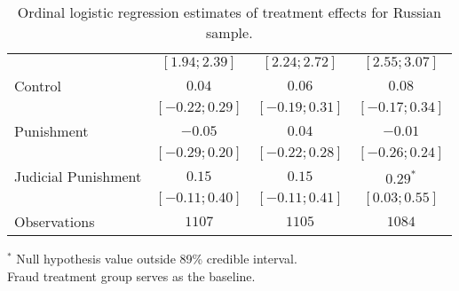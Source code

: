 \begin{table}[h]
\begin{center}
\begin{threeparttable}
\begin{tabular}{l c c c}
                    & $ [ 1.94;  2.39]$ & $ [ 2.24;  2.72]$ & $ [ 2.55;  3.07]$ \\
Control             & $0.04$            & $0.06$            & $0.08$            \\
                    & $ [-0.22;  0.29]$ & $ [-0.19;  0.31]$ & $ [-0.17;  0.34]$ \\
Punishment          & $-0.05$           & $0.04$            & $-0.01$           \\
                    & $ [-0.29;  0.20]$ & $ [-0.22;  0.28]$ & $ [-0.26;  0.24]$ \\
Judicial Punishment & $0.15$            & $0.15$            & $0.29^{*}$        \\
                    & $ [-0.11;  0.40]$ & $ [-0.11;  0.41]$ & $ [ 0.03;  0.55]$ \\
\hline
Observations        & $1107$            & $1105$            & $1084$            \\
\hline
\end{tabular}
\begin{tablenotes}[flushleft]
\scriptsize{$^*$ Null hypothesis value outside 89\% credible interval.  \\
Fraud treatment group serves as the baseline.}
\end{tablenotes}
\end{threeparttable}
\caption{Ordinal logistic regression estimates of treatment effects for Russian sample.}
\label{table:coefficients}
\end{center}
\end{table}
